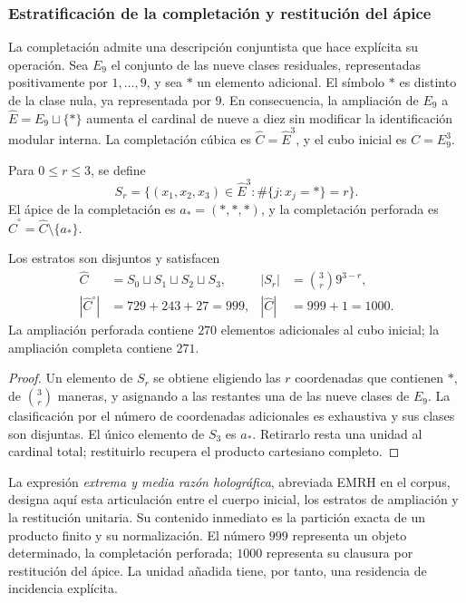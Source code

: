 \subsubsection{Estratificación de la completación y restitución del ápice}
\label{sec:revision-emrh}

La completación admite una descripción conjuntista que hace explícita su
operación. Sea \(E_9\) el conjunto de las nueve clases residuales, representadas
positivamente por \(1,\ldots,9\), y sea \(\ast\) un elemento adicional.
El símbolo \(\ast\) es distinto de la clase nula, ya representada por \(9\).
En consecuencia, la ampliación de \(E_9\) a
\(\widehat E=E_9\sqcup\{\ast\}\) aumenta el cardinal de nueve a diez
sin modificar la identificación modular interna. La completación cúbica es
\(\widehat C=\widehat E^3\), y el cubo inicial es \(C=E_9^3\).

\begin{definition}
Para \(0\leq r\leq3\), se define
\[
 S_r=\{(x_1,x_2,x_3)\in\widehat E^3:
             \#\{j:x_j=\ast\}=r\}.
\]
El ápice de la completación es \(a_\ast=(\ast,\ast,\ast)\), y la
completación perforada es \(\widehat C^{\circ}=\widehat C\setminus\{a_\ast\}\).
\end{definition}

\begin{proposition}
Los estratos son disjuntos y satisfacen
\begin{align}
 \widehat C&=S_0\sqcup S_1\sqcup S_2\sqcup S_3,
 &|S_r|&=\binom3r9^{3-r},\label{eq:revision-estratos}\\
 |\widehat C^{\circ}|&=729+243+27=999,
 &|\widehat C|&=999+1=1000.\label{eq:revision-999}
\end{align}
La ampliación perforada contiene \(270\) elementos adicionales al cubo
inicial; la ampliación completa contiene \(271\).
\end{proposition}
\begin{proof}
Un elemento de \(S_r\) se obtiene eligiendo las \(r\) coordenadas que
contienen \(\ast\), de \(\binom3r\) maneras, y asignando a las restantes
una de las nueve clases de \(E_9\). La clasificación por el número de
coordenadas adicionales es exhaustiva y sus clases son disjuntas. El único
elemento de \(S_3\) es \(a_\ast\). Retirarlo resta una unidad al cardinal
total; restituirlo recupera el producto cartesiano completo.
\end{proof}

La expresión \emph{extrema y media razón holográfica}, abreviada EMRH en
el corpus, designa aquí esta articulación entre el cuerpo inicial, los
estratos de ampliación y la restitución unitaria. Su contenido inmediato
es la partición exacta de un producto finito y su normalización. El número
\(999\) representa un objeto determinado, la completación perforada;
\(1000\) representa su clausura por restitución del ápice. La unidad
añadida tiene, por tanto, una residencia de incidencia explícita.

